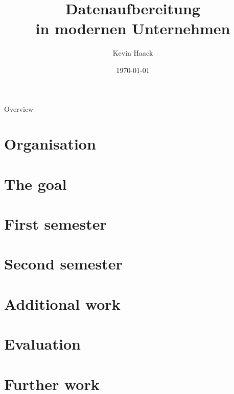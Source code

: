 \documentclass{beamer}
\title{Datenaufbereitung\\in modernen Unternehmen }
\author{Kevin Haack}
\institute{Paderborn University}
\date{\today}
\begin{document}
\begin{frame}
  \titlepage
\end{frame}

\begin{frame}{Overview}
\tableofcontents
\end{frame}

\section{Organisation}



\section{The goal}


\section{First semester}











\section{Second semester}
















\section{Additional work}


\section{Evaluation}


\section{Further work}

\end{document}
